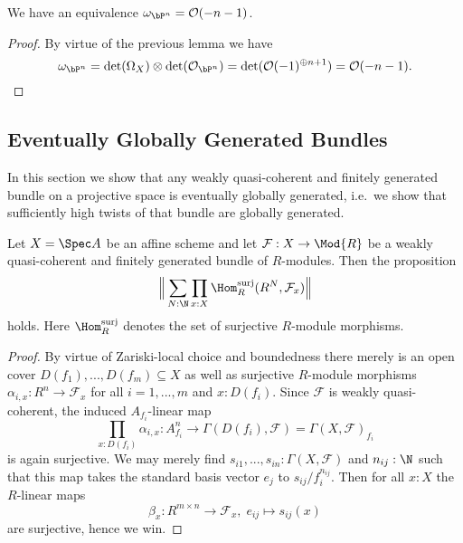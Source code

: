 \begin{corollary}\label{canonical-bundle-as-twist}
  We have an equivalence $\omega_{\bP^n} = \mathcal O(-n-1)$.
\end{corollary}

\begin{proof}
  By virtue of the previous lemma we have
  \[
    \omega_{\bP^n} = \det(\Omega_X) \otimes \det(\mathcal O_{\bP^n}) = \det(\mathcal O(-1)^{\oplus n+1}) = \mathcal O (-n-1).
  \]
\end{proof}

\subsection{Eventually Globally Generated Bundles}


In this section we show that any weakly quasi-coherent and finitely generated bundle on a projective space is eventually globally generated, i.e.\ we show that sufficiently high twists of that bundle are globally generated.

\begin{lemma}
  \label{wqc+fg-bundle-is-explicitly-generated}
  Let $X=\Spec A$ be an affine scheme and let $\mathcal F : X \to \Mod{R}$ be a weakly quasi-coherent and finitely generated bundle of $R$-modules.
  Then the proposition
  \[
    \Big\Vert
      \sum_{N:\N}\prod_{x:X}\Hom_R^\mathrm{surj}(R^N,\mathcal F_x)
    \Big\Vert
  \]
  holds. Here $\Hom_R^\mathrm{surj}$ denotes the set of surjective $R$-module morphisms.
\end{lemma}

\begin{proof}
  By virtue of Zariski-local choice and boundedness there merely is an open cover $D(f_1), ..., D(f_m) \subseteq X$ as well as surjective $R$-module morphisms $\alpha_{i,x} : R^n \to \mathcal F_x$ for all $i=1, ..., m$ and $x:D(f_i)$.
  Since $\mathcal F$ is weakly quasi-coherent, the induced $A_{f_i}$-linear map
  \[
    \textstyle\prod_{x:D(f_i)}\alpha_{i,x} :  A_{f_i}^n \longrightarrow \Gamma (D(f_i),\mathcal F) = \Gamma (X,\mathcal F)_{f_i}
  \]
  is again surjective. We may merely find $s_{i1}, ..., s_{in}:\Gamma (X,\mathcal F)$ and $n_{ij}:\N$ such that this map takes the standard basis vector $e_j$ to $s_{ij}/f_i^{n_{ij}}$.
  Then for all $x:X$ the $R$-linear maps
  \[
    \beta_x : R^{m \times n} \longrightarrow \mathcal F_x, \;
    e_{ij} \longmapsto s_{ij}(x)
  \]
  are surjective, hence we win.
\end{proof}


